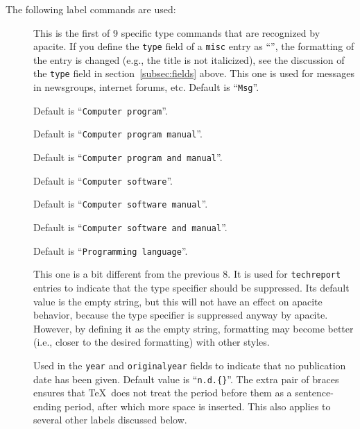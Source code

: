 \documentclass{article}
\newcommand{\pkg}[1]{\textsf{#1}}%
\newcommand{\fieldname}[1]{\texttt{#1}}%
\newcommand{\entryname}[1]{\texttt{#1}}%
\newcommand{\cmd}[1]{\texttt{\string#1}}%
\begin{document}
The following label commands are used:
\begin{description}
  \item[\cmd{\bibmessage}] This is the first of 9 specific type
      commands that are recognized by \pkg{apacite}. If you
      define the \fieldname{type} field of a \entryname{misc}
      entry as ``\cmd{\bibmessage}'', the formatting of the
      entry is changed (e.g., the title is not italicized),
      see the discussion of the \fieldname{type} field in
      section~\ref{subsec:fields} above. This one is used for
      messages in newsgroups, internet forums, etc.
      Default is ``\verb+Msg+''.

  \item[\cmd{\bibcomputerprogram}]
      Default is ``\verb+Computer program+''.

  \item[\cmd{\bibcomputerprogrammanual}]
      Default is ``\verb+Computer program manual+''.

  \item[\cmd{\bibcomputerprogramandmanual}]
      Default is ``\verb+Computer program and manual+''.

  \item[\cmd{\bibcomputersoftware}]
      Default is ``\verb+Computer software+''.

  \item[\cmd{\bibcomputersoftwaremanual}]
      Default is ``\verb+Computer software manual+''.

  \item[\cmd{\bibcomputersoftwareandmanual}]
      Default is ``\verb+Computer software and manual+''.

  \item[\cmd{\bibprogramminglanguage}]
      Default is ``\verb+Programming language+''.

  \item[\cmd{\bibnotype}]
      This one is a bit different from the previous 8. It is used for
      \entryname{techreport} entries to indicate that the type specifier
      should be suppressed. Its default value is the empty string, but this
      will not have an effect on \pkg{apacite} behavior, because the type
      specifier is suppressed anyway by \pkg{apacite}. However, by defining it
      as the empty string, formatting may become better (i.e., closer to the
      desired formatting) with other styles.

  \item[\cmd{\bibnodate}] Used in the \fieldname{year} and
      \fieldname{originalyear} fields to indicate that no
      publication date has been given. Default value is ``\verb+n.d.{}+''.
      The extra pair of braces ensures that \TeX\ does not treat
      the period before them as a sentence-ending period, after which
      more space is inserted. This also applies to several other
      labels discussed below.


\end{description}
\end{document}
